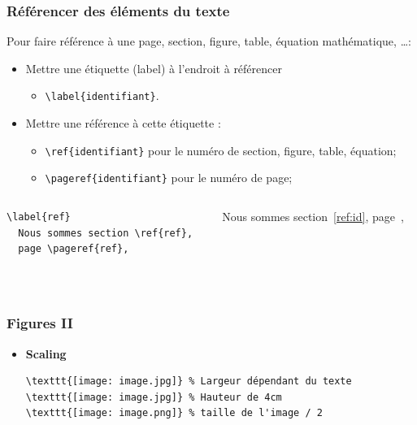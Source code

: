 \begin{frame}[fragile]
  \frametitle{Référencer des éléments du texte}
  Pour faire référence à une page, section, figure, table, équation mathématique, \dots:
  \begin{itemize}
    \item Mettre une étiquette (label) à l'endroit à référencer
      \begin{itemize}
        \item \lstinline|\label{identifiant}|.
      \end{itemize}
    \item Mettre une référence à cette étiquette :
      \begin{itemize}
        \item \lstinline|\ref{identifiant}| pour le numéro de section, figure, table, équation;
        \item \lstinline|\pageref{identifiant}| pour le numéro de page;
      \end{itemize}
  \end{itemize}
  \begin{columns}
    \begin{column}{0.5\textwidth}
      \begin{lstlisting}[style=nonumbers]
  \label{ref}
  Nous sommes section \ref{ref},
  page \pageref{ref},
      \end{lstlisting}
    \end{column}
    \begin{column}{0.5\textwidth}
      \label{ref:id}
      \par{}Nous sommes section~\ref{ref:id},
      page~\pageref{ref:id},
    \end{column}
  \end{columns}
\end{frame}

\begin{frame}[fragile]\
  \frametitle{Figures II}
  \begin{itemize}

    \item \textbf{Scaling}
  \begin{lstlisting}[style=nonumbers]
\texttt{[image: image.jpg]} % Largeur dépendant du texte
\texttt{[image: image.jpg]} % Hauteur de 4cm
\texttt{[image: image.png]} % taille de l'image / 2
  \end{lstlisting}
  \vspace{2em}
  \end{itemize}
\end{frame}

